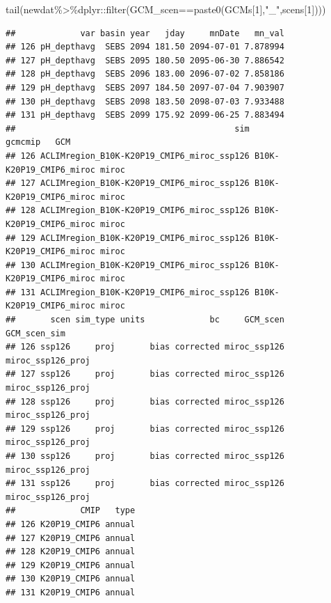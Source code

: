 \documentclass[
]{article}
\newenvironment{Shaded}{\begin{snugshade}}{\end{snugshade}}
\newcommand{\DecValTok}[1]{\textcolor[rgb]{0.00,0.00,0.81}{#1}}
\newcommand{\FunctionTok}[1]{\textcolor[rgb]{0.00,0.00,0.00}{#1}}
\newcommand{\NormalTok}[1]{#1}
\newcommand{\SpecialCharTok}[1]{\textcolor[rgb]{0.00,0.00,0.00}{#1}}
\newcommand{\StringTok}[1]{\textcolor[rgb]{0.31,0.60,0.02}{#1}}
\begin{document}
\begin{Shaded}
\begin{Highlighting}[]
\FunctionTok{tail}\NormalTok{(newdat}\SpecialCharTok{\%\textgreater{}\%}\NormalTok{dplyr}\SpecialCharTok{::}\FunctionTok{filter}\NormalTok{(GCM\_scen}\SpecialCharTok{==}\FunctionTok{paste0}\NormalTok{(GCMs[}\DecValTok{1}\NormalTok{],}\StringTok{"\_"}\NormalTok{,scens[}\DecValTok{1}\NormalTok{])))}
\end{Highlighting}
\end{Shaded}

\begin{verbatim}
##             var basin year   jday     mnDate   mn_val
## 126 pH_depthavg  SEBS 2094 181.50 2094-07-01 7.878994
## 127 pH_depthavg  SEBS 2095 180.50 2095-06-30 7.886542
## 128 pH_depthavg  SEBS 2096 183.00 2096-07-02 7.858186
## 129 pH_depthavg  SEBS 2097 184.50 2097-07-04 7.903907
## 130 pH_depthavg  SEBS 2098 183.50 2098-07-03 7.933488
## 131 pH_depthavg  SEBS 2099 175.92 2099-06-25 7.883494
##                                            sim                 gcmcmip   GCM
## 126 ACLIMregion_B10K-K20P19_CMIP6_miroc_ssp126 B10K-K20P19_CMIP6_miroc miroc
## 127 ACLIMregion_B10K-K20P19_CMIP6_miroc_ssp126 B10K-K20P19_CMIP6_miroc miroc
## 128 ACLIMregion_B10K-K20P19_CMIP6_miroc_ssp126 B10K-K20P19_CMIP6_miroc miroc
## 129 ACLIMregion_B10K-K20P19_CMIP6_miroc_ssp126 B10K-K20P19_CMIP6_miroc miroc
## 130 ACLIMregion_B10K-K20P19_CMIP6_miroc_ssp126 B10K-K20P19_CMIP6_miroc miroc
## 131 ACLIMregion_B10K-K20P19_CMIP6_miroc_ssp126 B10K-K20P19_CMIP6_miroc miroc
##       scen sim_type units             bc     GCM_scen      GCM_scen_sim
## 126 ssp126     proj       bias corrected miroc_ssp126 miroc_ssp126_proj
## 127 ssp126     proj       bias corrected miroc_ssp126 miroc_ssp126_proj
## 128 ssp126     proj       bias corrected miroc_ssp126 miroc_ssp126_proj
## 129 ssp126     proj       bias corrected miroc_ssp126 miroc_ssp126_proj
## 130 ssp126     proj       bias corrected miroc_ssp126 miroc_ssp126_proj
## 131 ssp126     proj       bias corrected miroc_ssp126 miroc_ssp126_proj
##             CMIP   type
## 126 K20P19_CMIP6 annual
## 127 K20P19_CMIP6 annual
## 128 K20P19_CMIP6 annual
## 129 K20P19_CMIP6 annual
## 130 K20P19_CMIP6 annual
## 131 K20P19_CMIP6 annual
\end{verbatim}
\end{document}
